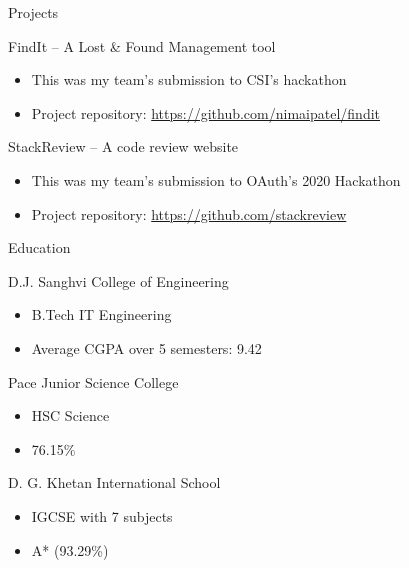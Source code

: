 \documentclass{article}
\newlength{\tabin}
\newlength{\secsep}
\newcommand{\lineunder}{\vspace*{-8pt} \\ \hspace*{-6pt} \hrulefill \\ \vspace*{-15pt}}
\newenvironment{tabbedsection}[1]{
	\begin{list}{}{
		\setlength{\itemsep}{0pt}
		\setlength{\labelsep}{0pt}
		\setlength{\labelwidth}{0pt}
		\setlength{\leftmargin}{\tabin}
		\setlength{\rightmargin}{\tabin}
		\setlength{\listparindent}{0pt}
		\setlength{\parsep}{0pt}
		\setlength{\parskip}{0pt}
		\setlength{\partopsep}{0pt}
		\setlength{\topsep}{#1}
	}
	\item[]
}{\end{list}}
\newenvironment{resume_section}[1]{
	\filbreak
	\vspace{2\secsep}
	\textsc{\large#1}
	\lineunder
	\begin{tabbedsection}{\secsep}
}{\end{tabbedsection}}
\newenvironment{resume_subsection}[2][]{
	\textbf{#2} \hfill {\footnotesize #1} \hspace{2em}
	\begin{tabbedsection}{0.5\secsep}
}{\end{tabbedsection}}
\newenvironment{subitems}{
	\renewcommand{\labelitemi}{-}
	\begin{itemize}
		\setlength{\labelsep}{1em}
}{\end{itemize}}
\begin{document}
\begin{resume_section}{Projects}
	\begin{resume_subsection}{FindIt -- A Lost {\&} Found Management tool}
		\begin{subitems}
			\item This was my team's submission to CSI's hackathon
			\item Project repository: \href{https://github.com/nimaipatel/findit}{https://github.com/nimaipatel/findit}
		\end{subitems}
	\end{resume_subsection}

	\begin{resume_subsection}{StackReview -- A code review website}
		\begin{subitems}
			\item This was my team's submission to OAuth's 2020 Hackathon
			\item Project repository: \href{https://github.com/stackreview}{https://github.com/stackreview}
		\end{subitems}
	\end{resume_subsection}

\end{resume_section}

\begin{resume_section}{Education}

	\begin{resume_subsection}[2019 - 2023 (expected)]{D.J. Sanghvi College of Engineering}
		\begin{subitems}
			\item B.Tech IT Engineering
			\item Average CGPA over 5 semesters: 9.42
		\end{subitems}
	\end{resume_subsection}


	\begin{resume_subsection}[2017 - 2019]{Pace Junior Science College}
		\begin{subitems}
			\item HSC Science
		\item 76.15{\%}
		\end{subitems}
	\end{resume_subsection}

	\begin{resume_subsection}[2017]{D. G. Khetan International School}
		\begin{subitems}
			\item IGCSE with 7 subjects
		\item A* (93.29{\%})
		\end{subitems}
	\end{resume_subsection}

\end{resume_section}

\vspace{1cm}
\end{document}
